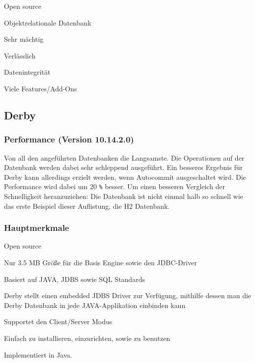 \begin{compactitem}
    \item Open source
    \item Objektrelationale Datenbank        
    \item Sehr mächtig
    \item Verlässlich
    \item Datenintegrität
    \item Viele Features/Add-Ons
\end{compactitem}
 
\subsection{Derby}
\subsubsection{Performance (Version 10.14.2.0)}
Von all den angeführten Datenbanken die Langsamste. Die Operationen auf der Datenbank werden dabei sehr schleppend ausgeführt. Ein besseres Ergebnis für Derby kann allerdings erzielt werden, wenn Autocommit ausgeschaltet wird. Die Performance wird dabei um 20 \texttt{\%} besser. Um einen besseren Vergleich der Schnelligkeit heranzuziehen: Die Datenbank ist nicht einmal halb so schnell wie das erste Beispiel dieser Auflistung, die H2 Datenbank.
 
\subsubsection{Hauptmerkmale}
 
\begin{compactitem}
    \item Open source
    \item Nur 3.5 MB Größe für die Basis Engine sowie den JDBC-Driver        
    \item Basiert auf JAVA, JDBS sowie SQL Standards
    \item Derby stellt einen embedded JDBS Driver zur Verfügung, mithilfe dessen man die Derby Datenbank in jede JAVA-Applikation einbinden kann
    \item Supportet den Client/Server Modus
    \item Einfach zu installieren, einzurichten, sowie zu benutzen
\end{compactitem}
 
Implementiert in Java.
